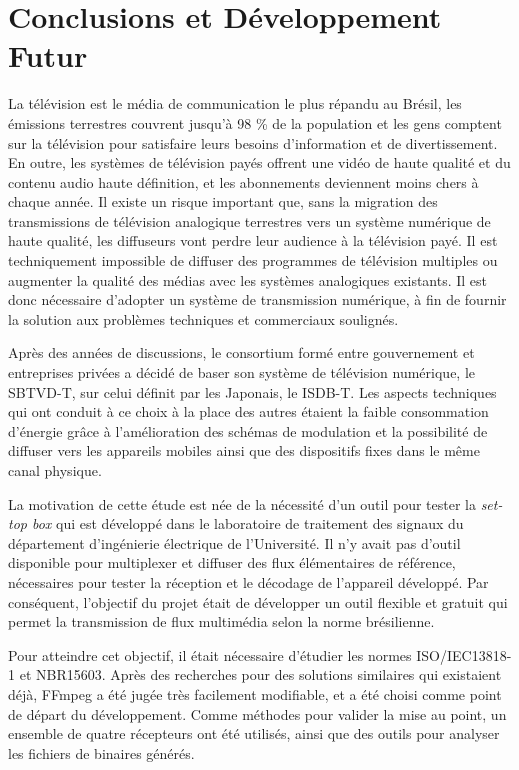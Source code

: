 \documentclass[12pt,a4paper]{article}
\begin{document}
\section[Conclusions et Développement Futur]{Conclusions et Développement Futur}

La télévision est le média de communication le plus répandu au Brésil, les émissions terrestres couvrent jusqu'à 98 \% de la population et les gens comptent sur la télévision pour satisfaire leurs besoins d'information et de divertissement. En outre, les systèmes de télévision payés offrent une vidéo de haute qualité et du contenu audio haute définition, et les abonnements deviennent moins chers à chaque année. Il existe un risque important que, sans la migration des transmissions de télévision analogique terrestres vers un système numérique de haute qualité, les diffuseurs vont perdre leur audience à la télévision payé. Il est techniquement impossible de diffuser des programmes de télévision multiples ou augmenter la qualité des médias avec les systèmes analogiques existants. Il est donc nécessaire d'adopter un système de transmission numérique, à fin de fournir la solution aux problèmes techniques et commerciaux soulignés.

Après des années de discussions, le consortium formé entre gouvernement et entreprises privées a décidé de baser son système de télévision numérique, le SBTVD-T, sur celui définit par les Japonais, le ISDB-T. Les aspects techniques qui ont conduit à ce choix à la place des autres étaient la faible consommation d'énergie grâce à l'amélioration des schémas de modulation et la possibilité de diffuser vers les appareils mobiles ainsi que des dispositifs fixes dans le même canal physique.

La motivation de cette étude est née de la nécessité d'un outil pour tester la \textit{set-top box} qui est développé dans le laboratoire de traitement des signaux du département d'ingénierie électrique de l'Université. Il n'y avait pas d'outil disponible pour multiplexer et diffuser des flux élémentaires de référence, nécessaires pour tester la réception et le décodage de l'appareil développé. Par conséquent, l'objectif du projet était de développer un outil flexible et gratuit qui permet la transmission de flux multimédia selon la norme brésilienne.

Pour atteindre cet objectif, il était nécessaire d'étudier les normes ISO/IEC13818-1 et NBR15603. Après des recherches pour des solutions similaires qui existaient déjà, FFmpeg a été jugée très facilement modifiable, et a été choisi comme point de départ du développement. Comme méthodes pour valider la mise au point, un ensemble de quatre récepteurs ont été utilisés, ainsi que des outils pour analyser les fichiers de binaires générés.
\end{document}
